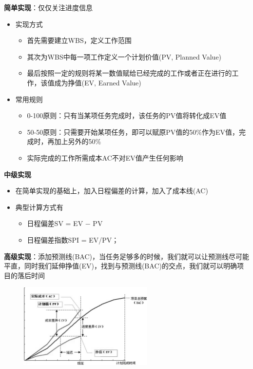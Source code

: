 \begin{solution}
\textbf{简单实现}：仅仅关注进度信息
\begin{itemize}
    \item 实现方式
    \begin{itemize}
        \item 首先需要建立WBS，定义工作范围
        \item 其次为WBS中每一项工作定义一个计划价值(PV, Planned Value)
        \item 最后按照一定的规则将某一数值赋给已经完成的工作或者正在进行的工作，该值成为挣值(EV, Earned Value)
    \end{itemize}
    \item 常用规则
    \begin{itemize}
        \item 0-100原则：只有当某项任务完成时，该任务的PV值将转化成EV值
        \item 50-50原则：只需要开始某项任务，即可以赋原PV值的50\%作为EV值，完成时，再加上另外的50\%
        \item 实际完成的工作所需成本AC不对EV值产生任何影响
    \end{itemize}
\end{itemize}

\textbf{中级实现}
\begin{itemize}
    \item 在简单实现的基础上，加入日程偏差的计算，加入了成本线(AC)
    \item 典型计算方式有
    \vspace{-0.8em}
    \begin{multicols}{2}
        \begin{itemize}
            \item 日程偏差SV = EV $-$ PV
            \item 日程偏差指数SPI = EV/PV；
        \end{itemize}
    \end{multicols}
    \vspace{-1em}
\end{itemize}

\textbf{高级实现}：添加预测线(BAC)，当任务足够多的时候，我们就可以让预测线尽可能平直，同时我们延伸挣值(EV)，找到与预测线(BAC)的交点，我们就可以明确项目的落后时间

\begin{figure}[H]
    \vspace{-0.5em}
	\centering
	\includegraphics[width=0.6\textwidth]{挣值管理图解.png}
    \vspace{-1em}
\end{figure}


\end{solution}
